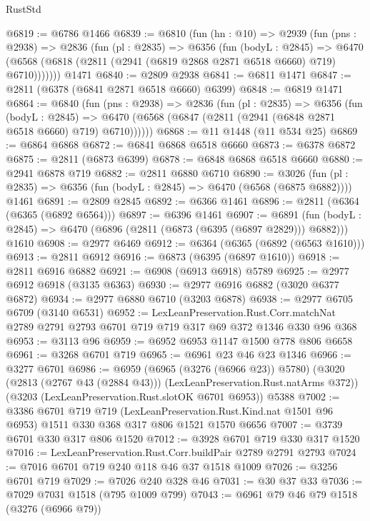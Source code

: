 \begin{lexlean}{RustStd}
\begin{coremodule}
{\begin{coremodule}
{{{{{{{{{{{{{{{@6819 := @6786 @1466
@6839 := @6810
    (fun (hn : @10) =>
    @2939
      (fun (pns : @2938) =>
      @2836
        (fun (pl : @2835) =>
        @6356
          (fun (bodyL : @2845) =>
          @6470 (@6568 (@6818 (@2811 (@2941 (@6819 @2868 @2871 @6518 @6660) @719) @6710)))))))
    @1471
@6840 := @2809 @2938
@6841 := @6811 @1471
@6847 := @2811 (@6378 (@6841 @2871 @6518 @6660) @6399)
@6848 := @6819 @1471
@6864 := @6840
    (fun (pns : @2938) =>
    @2836
      (fun (pl : @2835) =>
      @6356
        (fun (bodyL : @2845) =>
        @6470 (@6568 (@6847 (@2811 (@2941 (@6848 @2871 @6518 @6660) @719) @6710))))))
@6868 := @11 @1448 (@11 @534 @25)
@6869 := @6864 @6868
@6872 := @6841 @6868 @6518 @6660
@6873 := @6378 @6872
@6875 := @2811 (@6873 @6399)
@6878 := @6848 @6868 @6518 @6660
@6880 := @2941 @6878 @719
@6882 := @2811 @6880 @6710
@6890 := @3026
    (fun (pl : @2835) => @6356 (fun (bodyL : @2845) => @6470 (@6568 (@6875 @6882))))
    @1461
@6891 := @2809 @2845
@6892 := @6366 @1461
@6896 := @2811 (@6364 (@6365 (@6892 @6564)))
@6897 := @6396 @1461
@6907 := @6891
    (fun (bodyL : @2845) => @6470 (@6896 (@2811 (@6873 (@6395 (@6897 @2829))) @6882)))
    @1610
@6908 := @2977 @6469
@6912 := @6364 (@6365 (@6892 (@6563 @1610)))
@6913 := @2811 @6912
@6916 := @6873 (@6395 (@6897 @1610))
@6918 := @2811 @6916 @6882
@6921 := @6908 (@6913 @6918) @5789
@6925 := @2977 @6912 @6918 (@3135 @6363)
@6930 := @2977 @6916 @6882 (@3020 @6377 @6872)
@6934 := @2977 @6880 @6710 (@3203 @6878)
@6938 := @2977 @6705 @6709 (@3140 @6531)
@6952 := LexLeanPreservation.Rust.Corr.matchNat
    @2789
    @2791
    @2793
    @6701
    @719
    @719
    @317
    @69
    @372
    @1346
    @330
    @96
    @368
@6953 := @3113 @96
@6959 := @6952 @6953 @1147 @1500 @778 @806 @6658
@6961 := @3268 @6701 @719
@6965 := @6961 @23 @46 @23 @1346
@6966 := @3277 @6701
@6986 := @6959
    (@6965 (@3276 (@6966 @23)) @5780)
    (@3020 (@2813 (@2767 @43 (@2884 @43))) (LexLeanPreservation.Rust.natArms @372))
    (@3203 (LexLeanPreservation.Rust.slotOK @6701 @6953))
    @5388
@7002 := @3386
    @6701
    @719
    @719
    (LexLeanPreservation.Rust.Kind.nat @1501 @96 @6953)
    @1511
    @330
    @368
    @317
    @806
    @1521
    @1570
    @6656
@7007 := @3739 @6701 @330 @317 @806 @1520
@7012 := @3928 @6701 @719 @330 @317 @1520
@7016 := LexLeanPreservation.Rust.Corr.buildPair @2789 @2791 @2793
@7024 := @7016 @6701 @719 @240 @118 @46 @37 @1518 @1009
@7026 := @3256 @6701 @719
@7029 := @7026 @240 @328 @46
@7031 := @30 @37 @33
@7036 := @7029 @7031 @1518 (@795 @1009 @799)
@7043 := @6961 @79 @46 @79 @1518 (@3276 (@6966 @79))
}}}}}}}}}}}}}}}
\end{coremodule}}
\end{coremodule}
\end{lexlean}
